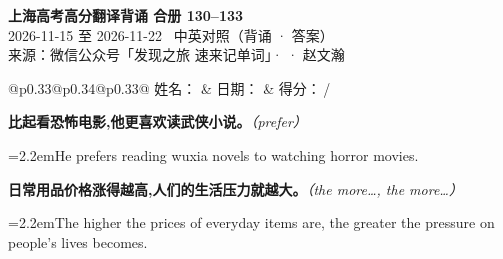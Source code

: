 \documentclass[11pt,a4paper]{article}
\newcommand{\num}[1]{\makebox[1.9em][r]{#1.}\hspace{0.3em}}
\newcommand{\prompt}[1]{\emph{\textcolor{tipblue}{\small（#1）}}}
\begin{document}
\pagestyle{plain}
\begin{center}
{\LARGE\bfseries 上海高考高分翻译背诵 \quad 合册 130–133}\\[0.25em]
{\large 2026-11-15 至 2026-11-22 \quad\ 中英对照（背诵 · 答案）}\\[0.35em]
{\footnotesize 来源：微信公众号「发现之旅 速来记单词」·  · 赵文瀚}
\end{center}

\vspace{0.4em}
\noindent\begin{tabular}{@{}p{0.33\textwidth}@{}p{0.34\textwidth}@{}p{0.33\textwidth}@{}}
姓名：\underline{\hspace{2.0cm}} & 日期：\underline{\hspace{2.0cm}} & 得分：\underline{\hspace{1.4cm}}\,/ \\
\end{tabular}

\vspace{0.5em}

\vspace{0.8em}
\vspace{0.35em}\vspace{0.15em}

\begin{minipage}{\linewidth}

\num{1}\textbf{比起看恐怖电影,他更喜欢读武侠小说。}\prompt{prefer}

\vspace{0.15em}

\noindent\hangindent=2.2em\hspace{2.2em}He prefers reading wuxia novels to watching horror movies.

\end{minipage}

\begin{minipage}{\linewidth}

\num{2}\textbf{日常用品价格涨得越高,人们的生活压力就越大。}\prompt{the more…, the more…}

\vspace{0.15em}

\noindent\hangindent=2.2em\hspace{2.2em}The higher the prices of everyday items are, the greater the pressure on people’s lives becomes.

\end{minipage}
\end{document}
